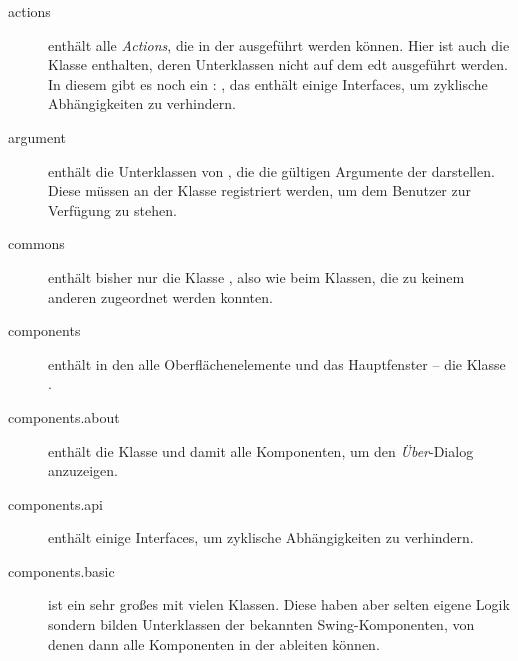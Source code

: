 \begin{description}
\item[actions] enthält alle \emph{Actions}, die in der \mdg ausgeführt werden können. Hier ist auch die Klasse  enthalten, deren Unterklassen nicht auf dem \gls{edt} ausgeführt werden. In diesem \package gibt es noch ein \subpackage: , das enthält einige Interfaces, um zyklische Abhängigkeiten zu verhindern.
\item[argument] enthält die Unterklassen von , die die gültigen Argumente der \mdg darstellen. Diese müssen an der Klasse  registriert werden, um dem Benutzer zur Verfügung zu stehen.
\item[commons] enthält bisher nur die Klasse , also wie beim \md Klassen, die zu keinem anderen \package zugeordnet werden konnten.
\item[components] enthält in den \subpackages alle Oberflächenelemente und das Hauptfenster -- die Klasse .
\item[components.about] enthält die Klasse  und damit alle Komponenten, um den \emph{Über}-Dialog anzuzeigen.
\item[components.api] enthält einige Interfaces, um zyklische Abhängigkeiten zu verhindern.
\item[components.basic] ist ein sehr großes \package mit vielen Klassen. Diese haben aber selten eigene Logik sondern bilden Unterklassen der bekannten Swing-Komponenten, von denen dann alle Komponenten in der \mdg ableiten können.


\end{description}
